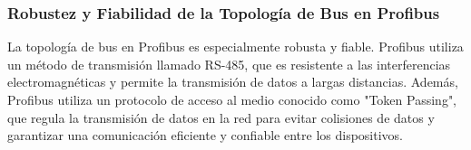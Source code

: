 \subsubsection{Robustez y Fiabilidad de la Topología de Bus en Profibus}

La topología de bus en Profibus es especialmente robusta y fiable. Profibus utiliza un método de transmisión llamado RS-485, que es resistente a las interferencias electromagnéticas y permite la transmisión de datos a largas distancias. Además, Profibus utiliza un protocolo de acceso al medio conocido como "Token Passing", que regula la transmisión de datos en la red para evitar colisiones de datos y garantizar una comunicación eficiente y confiable entre los dispositivos.\\
